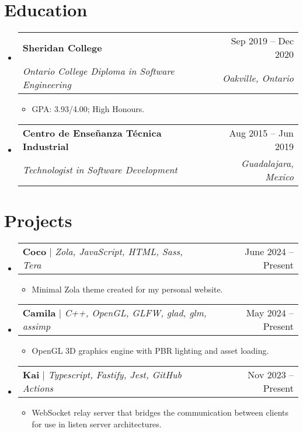 \documentclass[letterpaper,11pt]{article}
\makeatletter
\newcommand{\resumeItem}[1]{
  \item\small{#1}
}
\newcommand{\resumeSubheading}[4]{
  \vspace{-2pt}\item
    \begin{tabular*}{0.97\textwidth}[t]{l@{\extracolsep{\fill}}r}
      \textbf{#1} & #2 \\
      \textit{\small#3} & \textit{\small #4} \\
    \end{tabular*}\vspace{-7pt}
}
\newcommand{\resumeProjectHeading}[2]{
    \item
    \begin{tabular*}{0.97\textwidth}{l@{\extracolsep{\fill}}r}
      \small#1 & #2 \\
    \end{tabular*}\vspace{-7pt}
}
\newcommand{\resumeSubHeadingListStart}{\begin{itemize}[leftmargin=0.15in, label={}]}
\newcommand{\resumeSubHeadingListEnd}{\end{itemize}}
\newcommand{\resumeItemListStart}{\begin{itemize}}
\newcommand{\resumeItemListEnd}{\end{itemize}}
\makeatother
\begin{document}
\section{Education}
  \resumeSubHeadingListStart
    \resumeSubheading
      {Sheridan College}{Sep 2019 -- Dec 2020}
      {Ontario College Diploma in Software Engineering}{Oakville, Ontario}
      \resumeItemListStart
        \resumeItem{GPA: 3.93/4.00; High Honours.}
      \resumeItemListEnd
    \resumeSubheading
      {Centro de Enseñanza Técnica Industrial}{Aug 2015 -- Jun 2019}
      {Technologist in Software Development}{Guadalajara, Mexico}
  \resumeSubHeadingListEnd

\section{Projects}
    \resumeSubHeadingListStart
      \resumeProjectHeading
          {\textbf{Coco} $|$ \emph{Zola, JavaScript, HTML, Sass, Tera}}{June 2024 -- Present}
          \resumeItemListStart
            \resumeItem{Minimal Zola theme created for my personal website.}
          \resumeItemListEnd
      \resumeProjectHeading
          {\textbf{Camila} $|$ \emph{C++, OpenGL, GLFW, glad, glm, assimp}}{May 2024 -- Present}
          \resumeItemListStart
            \resumeItem{OpenGL 3D graphics engine with PBR lighting and asset loading.}
          \resumeItemListEnd
      \resumeProjectHeading
          {\textbf{Kai} $|$ \emph{Typescript, Fastify, Jest, GitHub Actions }}{Nov 2023 -- Present}
          \resumeItemListStart
            \resumeItem{WebSocket relay server that bridges the communication between clients for use in listen server architectures.}
          \resumeItemListEnd
    \resumeSubHeadingListEnd
\end{document}
